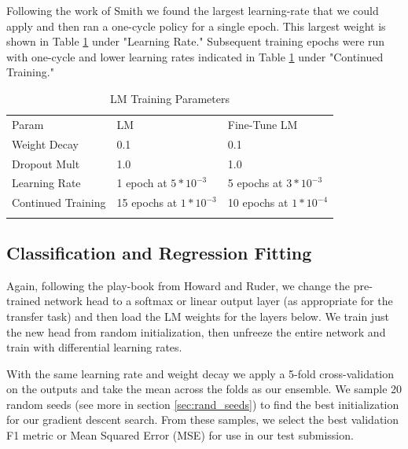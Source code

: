 \documentclass[runningheads]{llncs}
\begin{document}
Following the work of Smith\cite{Smith:DBLP:journals/corr/abs-1803-09820} we found the largest learning-rate that we could apply and then ran a one-cycle policy for a single epoch.  This largest weight is shown in Table \ref{tab:tab_training} under "Learning Rate." Subsequent training epochs were run with one-cycle and lower learning rates indicated in Table \ref{tab:tab_training} under "Continued Training."

\begin{table}[ht]
	\caption{LM Training Parameters}
	\label{tab:tab_training}       %
\begin{tabular}{lll}
	\hline\noalign{\smallskip}
	Param & LM & Fine-Tune LM \\
	\noalign{\smallskip}\hline\noalign{\smallskip}
	Weight Decay & 0.1 & 0.1 \\
	Dropout Mult & 1.0 & 1.0 \\
	Learning Rate & 1 epoch at $5*10^{-3}$ & 5 epochs at $3*10^{-3}$ \\
    Continued Training & 15 epochs at $1*10^{-3}$ & 10 epochs at $1*10^{-4}$\\
	\noalign{\smallskip}\hline
\end{tabular}
\end{table}

\subsection{Classification and Regression Fitting}
Again, following the play-book from Howard and Ruder\cite{HowardRuder:DBLP:journals/corr/abs-1801-06146}, we change the pre-trained network head to a softmax or linear output layer (as appropriate for the transfer task) and then load the LM weights for the layers below.  We train just the new head from random initialization, then unfreeze the entire network and train with differential learning rates.

With the same learning rate and weight decay we apply a 5-fold cross-validation on the outputs and take the mean across the folds as our ensemble.  We sample 20 random seeds (see more in section \ref{sec:rand_seeds}) to find the best initialization for our gradient descent search.  From these samples, we select the best validation F1 metric or Mean Squared Error (MSE) for use in our test submission.
\end{document}
